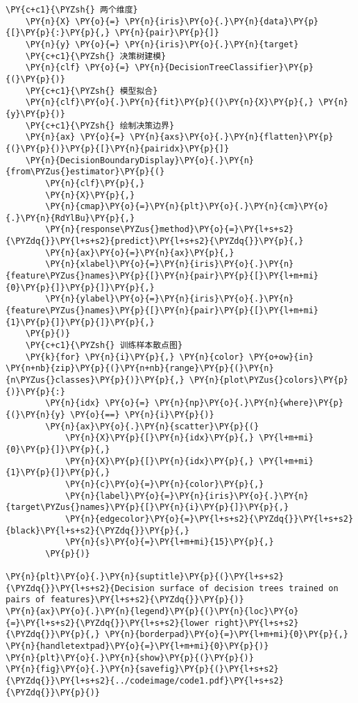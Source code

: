 \begin{Verbatim}[commandchars=\\\{\}]
    \PY{c+c1}{\PYZsh{} 两个维度}
    \PY{n}{X} \PY{o}{=} \PY{n}{iris}\PY{o}{.}\PY{n}{data}\PY{p}{[}\PY{p}{:}\PY{p}{,} \PY{n}{pair}\PY{p}{]}
    \PY{n}{y} \PY{o}{=} \PY{n}{iris}\PY{o}{.}\PY{n}{target}
    \PY{c+c1}{\PYZsh{} 决策树建模}
    \PY{n}{clf} \PY{o}{=} \PY{n}{DecisionTreeClassifier}\PY{p}{(}\PY{p}{)}
    \PY{c+c1}{\PYZsh{} 模型拟合}
    \PY{n}{clf}\PY{o}{.}\PY{n}{fit}\PY{p}{(}\PY{n}{X}\PY{p}{,} \PY{n}{y}\PY{p}{)}
    \PY{c+c1}{\PYZsh{} 绘制决策边界}
    \PY{n}{ax} \PY{o}{=} \PY{n}{axs}\PY{o}{.}\PY{n}{flatten}\PY{p}{(}\PY{p}{)}\PY{p}{[}\PY{n}{pairidx}\PY{p}{]}
    \PY{n}{DecisionBoundaryDisplay}\PY{o}{.}\PY{n}{from\PYZus{}estimator}\PY{p}{(}
        \PY{n}{clf}\PY{p}{,}
        \PY{n}{X}\PY{p}{,}
        \PY{n}{cmap}\PY{o}{=}\PY{n}{plt}\PY{o}{.}\PY{n}{cm}\PY{o}{.}\PY{n}{RdYlBu}\PY{p}{,}
        \PY{n}{response\PYZus{}method}\PY{o}{=}\PY{l+s+s2}{\PYZdq{}}\PY{l+s+s2}{predict}\PY{l+s+s2}{\PYZdq{}}\PY{p}{,}
        \PY{n}{ax}\PY{o}{=}\PY{n}{ax}\PY{p}{,}
        \PY{n}{xlabel}\PY{o}{=}\PY{n}{iris}\PY{o}{.}\PY{n}{feature\PYZus{}names}\PY{p}{[}\PY{n}{pair}\PY{p}{[}\PY{l+m+mi}{0}\PY{p}{]}\PY{p}{]}\PY{p}{,}
        \PY{n}{ylabel}\PY{o}{=}\PY{n}{iris}\PY{o}{.}\PY{n}{feature\PYZus{}names}\PY{p}{[}\PY{n}{pair}\PY{p}{[}\PY{l+m+mi}{1}\PY{p}{]}\PY{p}{]}\PY{p}{,}
    \PY{p}{)}
    \PY{c+c1}{\PYZsh{} 训练样本散点图}
    \PY{k}{for} \PY{n}{i}\PY{p}{,} \PY{n}{color} \PY{o+ow}{in} \PY{n+nb}{zip}\PY{p}{(}\PY{n+nb}{range}\PY{p}{(}\PY{n}{n\PYZus{}classes}\PY{p}{)}\PY{p}{,} \PY{n}{plot\PYZus{}colors}\PY{p}{)}\PY{p}{:}
        \PY{n}{idx} \PY{o}{=} \PY{n}{np}\PY{o}{.}\PY{n}{where}\PY{p}{(}\PY{n}{y} \PY{o}{==} \PY{n}{i}\PY{p}{)}
        \PY{n}{ax}\PY{o}{.}\PY{n}{scatter}\PY{p}{(}
            \PY{n}{X}\PY{p}{[}\PY{n}{idx}\PY{p}{,} \PY{l+m+mi}{0}\PY{p}{]}\PY{p}{,}
            \PY{n}{X}\PY{p}{[}\PY{n}{idx}\PY{p}{,} \PY{l+m+mi}{1}\PY{p}{]}\PY{p}{,}
            \PY{n}{c}\PY{o}{=}\PY{n}{color}\PY{p}{,}
            \PY{n}{label}\PY{o}{=}\PY{n}{iris}\PY{o}{.}\PY{n}{target\PYZus{}names}\PY{p}{[}\PY{n}{i}\PY{p}{]}\PY{p}{,}
            \PY{n}{edgecolor}\PY{o}{=}\PY{l+s+s2}{\PYZdq{}}\PY{l+s+s2}{black}\PY{l+s+s2}{\PYZdq{}}\PY{p}{,}
            \PY{n}{s}\PY{o}{=}\PY{l+m+mi}{15}\PY{p}{,}
        \PY{p}{)}

\PY{n}{plt}\PY{o}{.}\PY{n}{suptitle}\PY{p}{(}\PY{l+s+s2}{\PYZdq{}}\PY{l+s+s2}{Decision surface of decision trees trained on pairs of features}\PY{l+s+s2}{\PYZdq{}}\PY{p}{)}
\PY{n}{ax}\PY{o}{.}\PY{n}{legend}\PY{p}{(}\PY{n}{loc}\PY{o}{=}\PY{l+s+s2}{\PYZdq{}}\PY{l+s+s2}{lower right}\PY{l+s+s2}{\PYZdq{}}\PY{p}{,} \PY{n}{borderpad}\PY{o}{=}\PY{l+m+mi}{0}\PY{p}{,} \PY{n}{handletextpad}\PY{o}{=}\PY{l+m+mi}{0}\PY{p}{)}
\PY{n}{plt}\PY{o}{.}\PY{n}{show}\PY{p}{(}\PY{p}{)}
\PY{n}{fig}\PY{o}{.}\PY{n}{savefig}\PY{p}{(}\PY{l+s+s2}{\PYZdq{}}\PY{l+s+s2}{../codeimage/code1.pdf}\PY{l+s+s2}{\PYZdq{}}\PY{p}{)}
\end{Verbatim}
